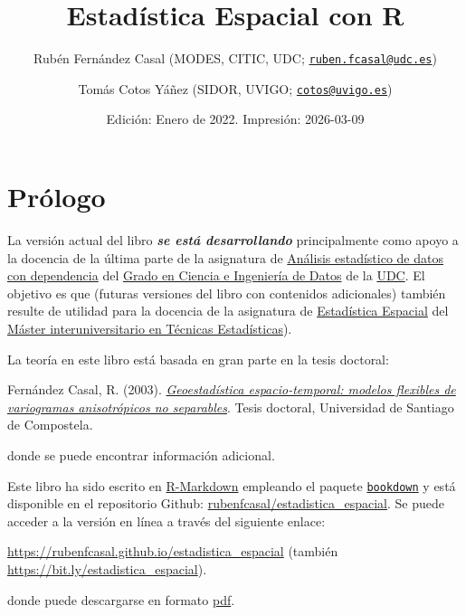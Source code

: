 \documentclass[
]{book}
\title{Estadística Espacial con R}
\author{Rubén Fernández Casal (MODES, CITIC, UDC; \href{mailto:ruben.fcasal@udc.es}{\nolinkurl{ruben.fcasal@udc.es}}) \and Tomás Cotos Yáñez (SIDOR, UVIGO; \href{mailto:cotos@uvigo.es}{\nolinkurl{cotos@uvigo.es}})}
\date{Edición: Enero de 2022. Impresión: 2026-03-09}
\theoremstyle{break}
\theoremstyle{definition}
\theoremstyle{definition}
\theoremstyle{definition}
\theoremstyle{definition}
\theoremstyle{remark}
\begin{document}
\maketitle

{
\setcounter{tocdepth}{1}
\tableofcontents
}
\chapter*{Prólogo}\label{pruxf3logo}

La versión actual del libro \textbf{\emph{se está desarrollando}} principalmente como apoyo a la docencia de la última parte de la asignatura de \href{https://guiadocente.udc.es/guia_docent/index.php?centre=614&ensenyament=614G02&assignatura=614G02022&idioma=cast}{Análisis estadístico de datos con dependencia} del \href{https://estudos.udc.es/es/study/start/614G02V01}{Grado en Ciencia e Ingeniería de Datos} de la \href{https://www.udc.es}{UDC}.
El objetivo es que (futuras versiones del libro con contenidos adicionales) también resulte de utilidad para la docencia de la asignatura de \href{http://eamo.usc.es/pub/mte/index.php?option=com_content&view=article&id=2202&idm=15&a\%C3\%B1o=2021}{Estadística Espacial} del \href{http://eio.usc.es/pub/mte}{Máster interuniversitario en Técnicas Estadísticas}).

La teoría en este libro está basada en gran parte en la tesis doctoral:

Fernández Casal, R. (2003). \href{https://rubenfcasal.github.io/files/Geoestadistica_espacio-temporal.pdf}{\emph{Geoestadística espacio-temporal: modelos flexibles de variogramas anisotrópicos no separables}}. Tesis doctoral, Universidad de Santiago de Compostela.

donde se puede encontrar información adicional.

Este libro ha sido escrito en \href{http://rmarkdown.rstudio.com}{R-Markdown} empleando el paquete \href{https://bookdown.org/yihui/bookdown/}{\texttt{bookdown}} y está disponible en el repositorio Github: \href{https://github.com/rubenfcasal/estadistica_espacial}{rubenfcasal/estadistica\_espacial}.
Se puede acceder a la versión en línea a través del siguiente enlace:

\url{https://rubenfcasal.github.io/estadistica_espacial} (también \url{https://bit.ly/estadistica_espacial}).

donde puede descargarse en formato \href{https://rubenfcasal.github.io/estadistica_espacial/estadistica_espacial.pdf}{pdf}.
\end{document}
